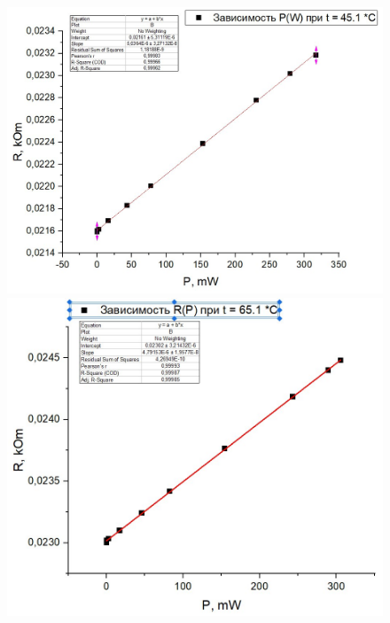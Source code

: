 \documentclass[a4paper,12pt]{article} %
\begin{document}
\begin{figure}
\begin{minipage}{\linewidth}
\centering
\includegraphics[scale=0.35]{45.1.jpg}
\caption{}
\end{minipage}
\begin{minipage}{\linewidth}
\centering
\includegraphics[scale=0.35]{65.1.jpg}
\caption{}
\end{minipage}
\end{figure}
\end{document}
